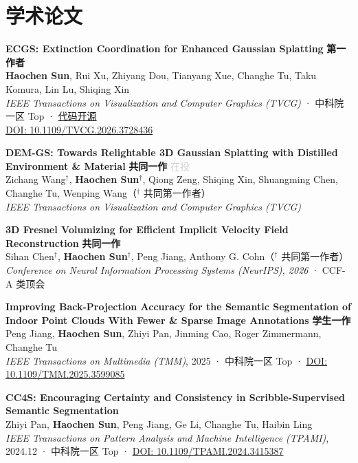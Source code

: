 \documentclass[10pt, a4paper]{ctexart}
\newcommand{\taghl}[1]{\mbox{\textcolor{accent}{\textbf{#1}}}}
\newcommand{\taggray}[1]{\mbox{\textcolor{lightgray}{#1}}}
\begin{document}
\section{学术论文}
\begin{pubs}
  \item \textbf{ECGS: Extinction Coordination for Enhanced Gaussian Splatting} \taghl{第一作者}\\
  \textbf{Haochen Sun}, Rui Xu, Zhiyang Dou, Tianyang Xue, Changhe Tu, Taku Komura, Lin Lu, Shiqing Xin\\
  \textit{IEEE Transactions on Visualization and Computer Graphics (TVCG)} · 中科院一区 Top ·
  \href{https://github.com/sun1233217T/ECGS.git}{代码开源}\\
  \href{https://doi.org/10.1109/TVCG.2026.3728436}{DOI: 10.1109/TVCG.2026.3728436}

  \item \textbf{DEM-GS: Towards Relightable 3D Gaussian Splatting with Distilled Environment \& Material} \taghl{共同一作} \taggray{在投}\\
  Zichang Wang$^{\dagger}$, \textbf{Haochen Sun}$^{\dagger}$, Qiong Zeng, Shiqing Xin, Shuangming Chen, Changhe Tu, Wenping Wang（$^{\dagger}$ 共同第一作者）\\
  \textit{IEEE Transactions on Visualization and Computer Graphics (TVCG)}

  \item \textbf{3D Fresnel Volumizing for Efficient Implicit Velocity Field Reconstruction} \taghl{共同一作}\\
  Sihan Chen$^{\dagger}$, \textbf{Haochen Sun}$^{\dagger}$, Peng Jiang, Anthony G. Cohn（$^{\dagger}$ 共同第一作者）\\
  \textit{Conference on Neural Information Processing Systems (NeurIPS), 2026} · CCF-A 类顶会

  \item \textbf{Improving Back-Projection Accuracy for the Semantic Segmentation of Indoor Point Clouds With Fewer \& Sparse Image Annotations} \taghl{学生一作}\\
  Peng Jiang, \textbf{Haochen Sun}, Zhiyi Pan, Jinming Cao, Roger Zimmermann, Changhe Tu\\
  \textit{IEEE Transactions on Multimedia (TMM)}, 2025 · 中科院一区 Top ·
  \href{https://doi.org/10.1109/TMM.2025.3599085}{DOI: 10.1109/TMM.2025.3599085}

  \item \textbf{CC4S: Encouraging Certainty and Consistency in Scribble-Supervised Semantic Segmentation}\\
  Zhiyi Pan, \textbf{Haochen Sun}, Peng Jiang, Ge Li, Changhe Tu, Haibin Ling\\
  \textit{IEEE Transactions on Pattern Analysis and Machine Intelligence (TPAMI)}, 2024.12 · 中科院一区 Top ·
  \href{https://doi.org/10.1109/TPAMI.2024.3415387}{DOI: 10.1109/TPAMI.2024.3415387}


\end{pubs}
\end{document}
